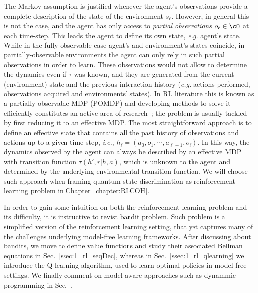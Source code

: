 The Markov assumption is justified whenever the agent's observations provide a complete description of the state of the environment $s_{\ell}$. However, in general this is not the case, and the agent has only access to \textit{partial observations} $o_{\ell}\in\cO$ at each time-step. This leads the agent to define its own state, \textit{e.g.} agent's state. While in the fully observable case agent's and environment's states coincide, in partially-observable environments the agent can only rely in such partial observations in order to learn. These observations would not allow to determine the dynamics even if $\tau$ was known, and they are generated from the current (environment) state and the previous interaction history (\textit{e.g.} actions performed, observations acquired and environments' states). In RL literature this is known as a partially-observable MDP (POMDP) and developing methods to solve it efficiently constitutes an active area of research~\cite{Singh1994,Mnih2013,Shani2013,Egorov2015,Zhu2018}; the problem is usually tackled by first reducing it to an effective MDP. The most straightforward approach is to define an effective state that contains all the past history of observations and actions up to a given time-step, \textit{i.e.}, $h_{\ell}=(a_0,o_{1},\cdots,a_{\ell-1},o_\ell)$. In this way, the dynamics observed by the agent can always be described by an effective MDP with transition function $\tau(h',r|h,a)$, which is unknown to the agent and determined by the underlying environmental transition function. We will choose such approach when framing quantum-state discrimination as reinforcement learning problem in Chapter~\ref{chapter:RLCOH}.

In order to gain some intuition on both the reinforcement learning problem and its difficulty, it is instructive to revist bandit problem. Such problem is a simplified version of the reinforcement learning setting, that yet captures many of the challenges underlying model-free learning frameworks. After discussing about bandits, we move to define value functions and study their associated Bellman equations in Sec.~\ref{ssec:1_rl_seqDec}, whereas in Sec.~\ref{ssec:1_rl_qlearning} we introduce the Q-learning algorithm, used to learn optimal policies in model-free settings. We finally comment on model-aware approaches such as dynammic programming in Sec.~\cite{ssec:1_rl_dp}.%
